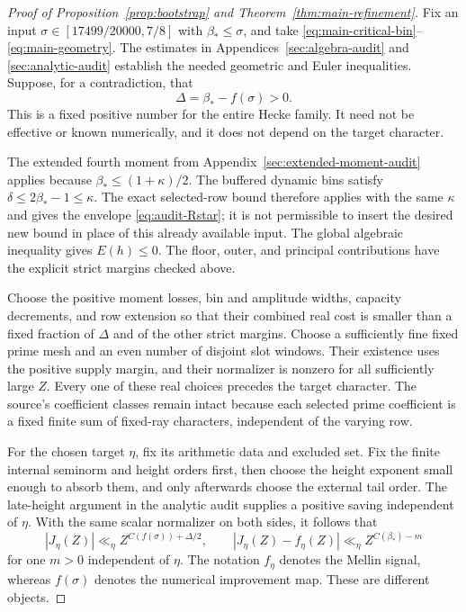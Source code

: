 \documentclass[11pt,a4paper]{article}
\numberwithin{equation}{section}
\theoremstyle{remark}
\begin{document}
\begin{proof}[Proof of Proposition~\ref{prop:bootstrap} and Theorem~\ref{thm:main-refinement}]
Fix an input $\sigma\in[17499/20000,7/8]$ with $\beta_*\le\sigma$,
and take \eqref{eq:main-critical-bin}--\eqref{eq:main-geometry}.
The estimates in Appendices~\ref{sec:algebra-audit} and
\ref{sec:analytic-audit} establish the needed geometric and Euler
inequalities. Suppose, for a
contradiction, that
\[
 \Delta=\beta_*-f(\sigma)>0.
\]
This is a fixed positive number for the entire Hecke family. It need
not be effective or known numerically, and it does not depend on the
target character.

The extended fourth moment from Appendix~\ref{sec:extended-moment-audit}
applies because
$\beta_*\le(1+\kappa)/2$. The buffered dynamic bins satisfy
$\delta\le2\beta_*-1\le\kappa$. The exact selected-row bound therefore
applies with the same $\kappa$ and gives the envelope
\eqref{eq:audit-Rstar}; it is not permissible to insert the desired
new bound in place of this already available input. The global
algebraic inequality gives $E(h)\le0$. The floor, outer, and principal
contributions have the explicit strict margins checked above.

Choose the positive moment losses, bin and amplitude widths, capacity
decrements, and row extension so that their combined real cost is
smaller than a fixed fraction of $\Delta$ and of the other strict
margins. Choose a sufficiently fine fixed prime mesh and an even number
of disjoint slot windows. Their existence uses the positive supply
margin, and their normalizer is nonzero for all sufficiently large
$Z$. Every one of these real choices precedes the target character.
The source's coefficient classes remain intact because each selected
prime coefficient is a fixed finite sum of fixed-ray characters,
independent of the varying row.

For the chosen target $\eta$, fix its arithmetic data and excluded set.
Fix the finite internal seminorm and height orders first, then choose
the height exponent small enough to absorb them, and only afterwards
choose the external tail order. The late-height argument in the
analytic audit supplies a positive saving independent of $\eta$.
With the same scalar normalizer on both sides, it follows that
\[
 |J_\eta(Z)|\ll_\eta Z^{C(f(\sigma))+\Delta/2},\qquad
 |J_\eta(Z)-f_\eta(Z)|
       \ll_\eta Z^{C(\beta_*)-m}
\]
for one $m>0$ independent of $\eta$. The notation $f_\eta$ denotes the
Mellin signal, whereas $f(\sigma)$ denotes the numerical improvement
map. These are different objects.


\end{proof}
\end{document}
